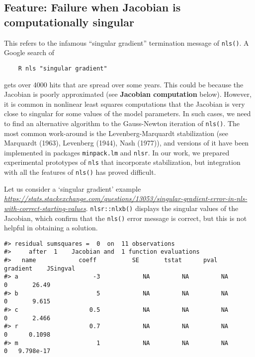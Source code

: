 \hypertarget{feature-failure-when-jacobian-is-computationally-singular}{%
\subsection{Feature: Failure when Jacobian is computationally singular}\label{feature-failure-when-jacobian-is-computationally-singular}}

This refers to the infamous ``singular gradient'' termination message of \texttt{nls()}.
A Google search of

\begin{verbatim}
    R nls "singular gradient"
\end{verbatim}

\noindent
gets over 4000 hits that are spread over some years. This could be because the
Jacobian is poorly approximated (see \textbf{Jacobian computation} below). However,
it is common in nonlinear least squares computations that the Jacobian is very close
to singular for some values of the model parameters. In such cases, we need to find
an alternative algorithm to the Gauss-Newton iteration of \texttt{nls()}. The most common
work-around is the Levenberg-Marquardt stabilization (see Marquardt (1963),
Levenberg (1944), Nash (1977)), and versions of it have been implemented in
packages \texttt{minpack.lm} and \texttt{nlsr}.
In our work, we prepared experimental prototypes of \texttt{nls} that incorporate
stabilization, but integration with all the features of \texttt{nls()} has proved difficult.

Let us consider a `singular gradient' example
\emph{\url{https://stats.stackexchange.com/questions/13053/singular-gradient-error-in-nls-with-correct-starting-values}}.
\texttt{nlsr::nlxb()} displays the singular values of the Jacobian, which confirm that
the \texttt{nls()} error message is correct, but this is not helpful in obtaining a
solution.

\begin{verbatim}
#> residual sumsquares =  0  on  11 observations
#>     after  1    Jacobian and  1 function evaluations
#>   name            coeff          SE       tstat      pval      gradient    JSingval   
#> a                     -3            NA         NA         NA           0       26.49  
#> b                      5            NA         NA         NA           0       9.615  
#> c                    0.5            NA         NA         NA           0       2.466  
#> r                    0.7            NA         NA         NA           0      0.1098  
#> m                      1            NA         NA         NA           0   9.798e-17
\end{verbatim}

